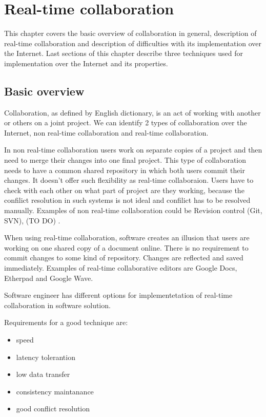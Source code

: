 \documentclass[12pt,oneside,draft]{fithesis2}
\begin{document}
\chapter{Real-time collaboration}
This chapter covers the basic overview of collaboration in general, description of real-time collaboration and description of difficulties with its implementation over the Internet. Last sections of this chapter describe three techniques used for implementation over the Internet and its properties.
\section{Basic overview}
Collaboration, as defined by English dictionary, is an act of working with another or others on a joint project. We can identify 2 types of collaboration over the Internet, non real-time collaboration and real-time collaboration.\par
In non real-time collaboration users work on separate copies of a project and then need to merge their changes into one final project. This type of collaboration needs to have a common shared repository in which both users commit their changes. It doesn't offer such flexibility as real-time collaboraion. Users have to check with each other on what part of project are they working, because the confilict resolution in such systems is not ideal and confilict has to be resolved manually. Examples of non real-time collaboration could be Revision control (Git, SVN), (TO DO) . \par When using real-time collaboration, software creates an illusion that users are working on one shared copy of a document online. There is no requirement to commit changes to some kind of repository. Changes are reflected and saved immediately. Examples of real-time collaborative editors are Google Docs, Etherpad and Google Wave. \par Software engineer has different options for implementetation of real-time collaboration in software solution. \par Requirements for a good technique are: 
\begin{itemize}
\item speed
\item latency tolerantion
\item low data transfer
\item consistency maintanance
\item good conflict resolution
\end{itemize}
\end{document}
